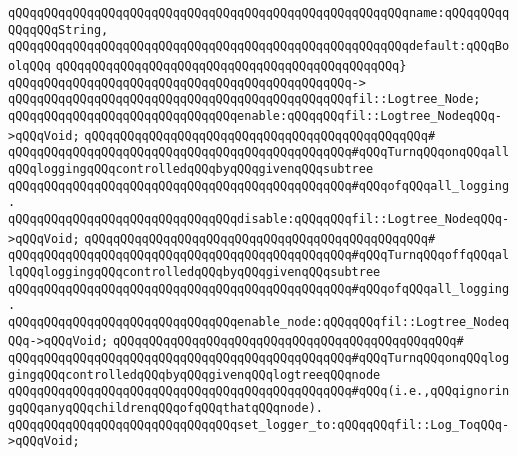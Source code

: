 \verb|qQQqqQQqqQQqqQQqqQQqqQQqqQQqqQQqqQQqqQQqqQQqqQQqqQQqqQQqname:qQQqqQQqqQQqqQQqString,|\newline
\verb|qQQqqQQqqQQqqQQqqQQqqQQqqQQqqQQqqQQqqQQqqQQqqQQqqQQqqQQqdefault:qQQqBoolqQQq|\newline
\verb|qQQqqQQqqQQqqQQqqQQqqQQqqQQqqQQqqQQqqQQqqQQqqQQq}|\newline
\verb|qQQqqQQqqQQqqQQqqQQqqQQqqQQqqQQqqQQqqQQqqQQqqQQq->|\newline
\verb|qQQqqQQqqQQqqQQqqQQqqQQqqQQqqQQqqQQqqQQqqQQqqQQqfil::Logtree_Node;|\newline
\newline
\newline
\verb|qQQqqQQqqQQqqQQqqQQqqQQqqQQqqQQqenable:qQQqqQQqfil::Logtree_NodeqQQq->qQQqVoid;|\newline
\verb|qQQqqQQqqQQqqQQqqQQqqQQqqQQqqQQqqQQqqQQqqQQqqQQq#|\newline
\verb|qQQqqQQqqQQqqQQqqQQqqQQqqQQqqQQqqQQqqQQqqQQqqQQq#qQQqTurnqQQqonqQQqallqQQqloggingqQQqcontrolledqQQqbyqQQqgivenqQQqsubtree|\newline
\verb|qQQqqQQqqQQqqQQqqQQqqQQqqQQqqQQqqQQqqQQqqQQqqQQq#qQQqofqQQqall_logging.|\newline
\newline
\verb|qQQqqQQqqQQqqQQqqQQqqQQqqQQqqQQqdisable:qQQqqQQqfil::Logtree_NodeqQQq->qQQqVoid;|\newline
\verb|qQQqqQQqqQQqqQQqqQQqqQQqqQQqqQQqqQQqqQQqqQQqqQQq#|\newline
\verb|qQQqqQQqqQQqqQQqqQQqqQQqqQQqqQQqqQQqqQQqqQQqqQQq#qQQqTurnqQQqoffqQQqallqQQqloggingqQQqcontrolledqQQqbyqQQqgivenqQQqsubtree|\newline
\verb|qQQqqQQqqQQqqQQqqQQqqQQqqQQqqQQqqQQqqQQqqQQqqQQq#qQQqofqQQqall_logging.|\newline
\newline
\verb|qQQqqQQqqQQqqQQqqQQqqQQqqQQqqQQqenable_node:qQQqqQQqfil::Logtree_NodeqQQq->qQQqVoid;|\newline
\verb|qQQqqQQqqQQqqQQqqQQqqQQqqQQqqQQqqQQqqQQqqQQqqQQq#|\newline
\verb|qQQqqQQqqQQqqQQqqQQqqQQqqQQqqQQqqQQqqQQqqQQqqQQq#qQQqTurnqQQqonqQQqloggingqQQqcontrolledqQQqbyqQQqgivenqQQqlogtreeqQQqnode|\newline
\verb|qQQqqQQqqQQqqQQqqQQqqQQqqQQqqQQqqQQqqQQqqQQqqQQq#qQQq(i.e.,qQQqignoringqQQqanyqQQqchildrenqQQqofqQQqthatqQQqnode).|\newline
\newline
\newline
\verb|qQQqqQQqqQQqqQQqqQQqqQQqqQQqqQQqset_logger_to:qQQqqQQqfil::Log_ToqQQq->qQQqVoid;|\newline
